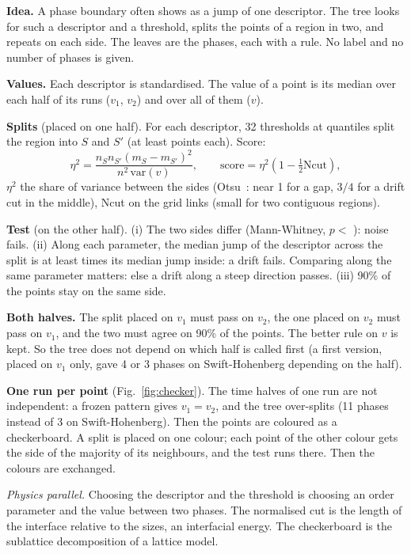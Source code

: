 \documentclass[11pt,a4paper]{article}
\newcommand{\code}[1]{\texttt{\detokenize{#1}}}
\begin{document}
\begin{tech}
\textbf{Idea.} A phase boundary often shows as a jump of one descriptor. The tree looks for such a descriptor and
a threshold, splits the points of a region in two, and repeats on each side. The leaves are the phases, each with a
rule. No label and no number of phases is given.

\textbf{Values.} Each descriptor is standardised. The value of a point is its median over each half of its runs
($v_1$, $v_2$) and over all of them ($v$).

\textbf{Splits} (placed on one half). For each descriptor, 32 thresholds at quantiles split the region into $S$ and
$S'$ (at least \code{MIN_PHASE} points each). Score:
\[
\eta^2=\frac{n_Sn_{S'}(m_S-m_{S'})^2}{n^2\,\mathrm{var}(v)},\qquad
\text{score}=\eta^2\left(1-\tfrac12\mathrm{Ncut}\right),
\]
$\eta^2$ the share of variance between the sides (Otsu~\cite{otsu1979}: near 1 for a gap, $3/4$ for a drift cut in
the middle), Ncut on the grid links (small for two contiguous regions).

\textbf{Test} (on the other half). (i) The two sides differ (Mann-Whitney, $p<$ \code{ALPHA}): noise fails. (ii)
Along each parameter, the median jump of the descriptor across the split is at least \code{RATIO} times its median
jump inside: a drift fails. Comparing along the same parameter matters: else a drift along a steep direction passes.
(iii) 90\% of the points stay on the same side.

\textbf{Both halves.} The split placed on $v_1$ must pass on $v_2$, the one placed on $v_2$ must pass on $v_1$, and
the two must agree on 90\% of the points. The better rule on $v$ is kept. So the tree does not depend on which half
is called first (a first version, placed on $v_1$ only, gave 4 or 3 phases on Swift-Hohenberg depending on the half).

\textbf{One run per point} (Fig.~\ref{fig:checker}). The time halves of one run are not independent: a frozen
pattern gives $v_1=v_2$, and the tree over-splits (11 phases instead of 3 on Swift-Hohenberg). Then the points are
coloured as a checkerboard. A split is placed on one colour; each point of the other colour gets the side of the
majority of its neighbours, and the test runs there. Then the colours are exchanged.

\emph{Physics parallel.} Choosing the descriptor and the threshold is choosing an order parameter and the value
between two phases. The normalised cut is the length of the interface relative to the sizes, an interfacial energy.
The checkerboard is the sublattice decomposition of a lattice model.
\end{tech}
\end{document}
